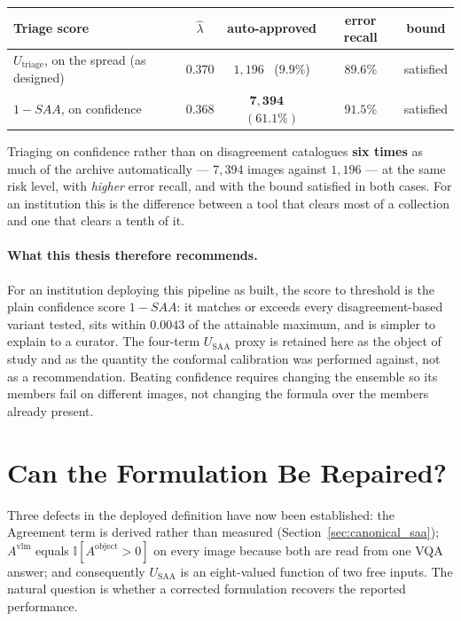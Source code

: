 \documentclass[12pt,a4paper]{report}
\begin{document}
\begin{center}
\small
\begin{tabular}{@{}l c c c c@{}}
\toprule
\textbf{Triage score} & $\hat\lambda$ & \textbf{auto-approved} & \textbf{error recall} & \textbf{bound} \\
\midrule
$U_{\text{triage}}$, on the spread (as designed) & $0.370$ & $1{,}196$ \ ($9.9\%$) & $89.6\%$ & satisfied \\
$1-SAA$, on confidence & $0.368$ & $\mathbf{7{,}394}$ \ $(\mathbf{61.1\%})$ & $\mathbf{91.5\%}$ & satisfied \\
\bottomrule
\end{tabular}
\end{center}

Triaging on confidence rather than on disagreement catalogues \textbf{six times} as much of the
archive automatically --- $7{,}394$ images against $1{,}196$ --- at the same risk level, with
\emph{higher} error recall, and with the bound satisfied in both cases. For an institution this is
the difference between a tool that clears most of a collection and one that clears a tenth of it.

\paragraph{What this thesis therefore recommends.} For an institution deploying this pipeline as
built, the score to threshold is the plain confidence score $1-SAA$: it matches or exceeds every
disagreement-based variant tested, sits within $0.0043$ of the attainable maximum, and is simpler
to explain to a curator. The four-term $U_{\text{SAA}}$ proxy is retained here as the object of
study and as the quantity the conformal calibration was performed against, not as a
recommendation. Beating confidence requires changing the ensemble so its members fail on
different images, not changing the formula over the members already present.

\section{Can the Formulation Be Repaired?}
\label{sec:formulation_repair}

Three defects in the deployed definition have now been established: the Agreement term is
derived rather than measured (Section~\ref{sec:canonical_saa}); $A^{\text{vlm}}$ equals
$\mathbb{I}[A^{\text{object}}>0]$ on every image because both are read from one VQA answer; and
consequently $U_{\text{SAA}}$ is an eight-valued function of two free inputs. The natural
question is whether a corrected formulation recovers the reported performance.
\end{document}
